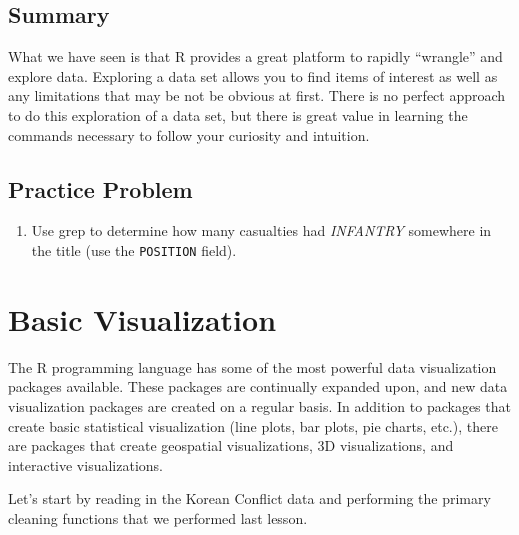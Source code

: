\documentclass[]{book}
\newenvironment{Shaded}{\begin{snugshade}}{\end{snugshade}}
\newcommand{\KeywordTok}[1]{\textcolor[rgb]{0.13,0.29,0.53}{\textbf{{#1}}}}
\newcommand{\DataTypeTok}[1]{\textcolor[rgb]{0.13,0.29,0.53}{{#1}}}
\newcommand{\StringTok}[1]{\textcolor[rgb]{0.31,0.60,0.02}{{#1}}}
\newcommand{\OtherTok}[1]{\textcolor[rgb]{0.56,0.35,0.01}{{#1}}}
\newcommand{\NormalTok}[1]{{#1}}
\providecommand{\tightlist}{%
  \setlength{\itemsep}{0pt}\setlength{\parskip}{0pt}}
\begin{document}
\section{Summary}\label{summary}

What we have seen is that R provides a great platform to rapidly
``wrangle'' and explore data. Exploring a data set allows you to find
items of interest as well as any limitations that may be not be obvious
at first. There is no perfect approach to do this exploration of a data
set, but there is great value in learning the commands necessary to
follow your curiosity and intuition.

\section{Practice Problem}\label{practice-problem-1}

\begin{enumerate}
\def\labelenumi{\arabic{enumi}.}
\tightlist
\item
  Use grep to determine how many casualties had \emph{INFANTRY}
  somewhere in the title (use the \texttt{POSITION} field).
\end{enumerate}

\chapter{Basic Visualization}\label{basic-visualization}

The R programming language has some of the most powerful data
visualization packages available. These packages are continually
expanded upon, and new data visualization packages are created on a
regular basis. In addition to packages that create basic statistical
visualization (line plots, bar plots, pie charts, etc.), there are
packages that create geospatial visualizations, 3D visualizations, and
interactive visualizations.

Let's start by reading in the Korean Conflict data and performing the
primary cleaning functions that we performed last lesson.

\begin{Shaded}
\end{Shaded}
\end{document}
